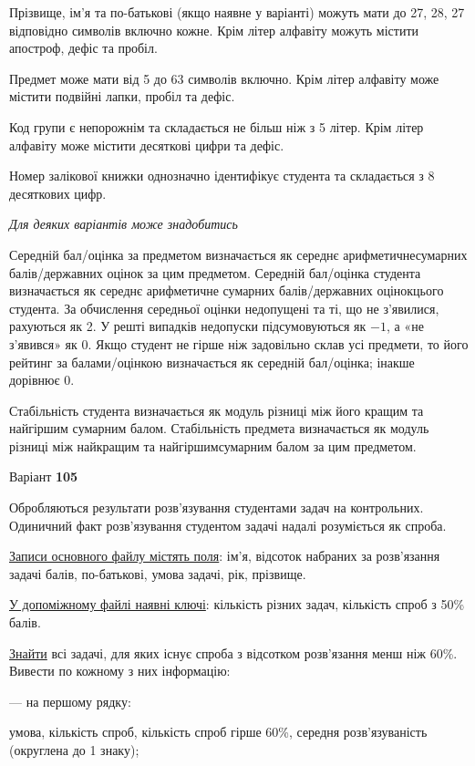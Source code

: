 \documentclass[11pt, ukrainian]{article}
\begin{document}
Прізвище, ім’я та по-батькові (якщо наявне у варіанті) можуть мати до 27, 28, 27 відповідно символів включно кожне. 
Крім літер алфавіту можуть містити апостроф, дефіс та пробіл.

Предмет може мати від 5 до 63 символів включно. 
Крім літер алфавіту може містити подвійні лапки, пробіл та дефіс.

Код групи є непорожнім та складається не більш ніж з 5 літер. 
Крім літер алфавіту може містити десяткові цифри та дефіс.


Номер залікової книжки однозначно ідентифікує студента та складається з 8 десяткових цифр. 

\bigskip\textit{Для деяких варіантів може знадобитись}

Середній бал/оцінка за предметом визначається як середнє арифметичнесумарних балів/державних оцінок за цим предметом. 
Середній бал/оцінка студента визначається як середнє арифметичне сумарних балів/державних оцінокцього студента. 
За обчислення середньої оцінки недопущені та ті, що не з’явилися, рахуються як 2.
У решті випадків недопуски підсумовуються як $-1$, а «не з’явився» як 0.
Якщо студент не гірше ніж задовільно склав усі предмети, 
то його рейтинг за балами/оцінкою визначається як середній бал/оцінка; інакше дорівнює 0.

Стабільність студента визначається як модуль різниці між його кращим та найгіршим сумарним балом.
Стабільність предмета визначається як модуль різниці між найкращим та найгіршимсумарним балом за цим предметом.






\par
\newpage
{\center Варіант  \No \textbf { 105 }\par}
\bigskip
Обробляються результати розв’язування студентами задач на контрольних.
Одиничний факт роз\-в’я\-зу\-вання студентом задачі надалі розуміється як спроба.

\underline{Записи основного файлу містять поля}: ім’я, відсоток набраних за розв’язання задачі балів, по-бать\-ко\-ві, умова задачі, рік, прізвище.

\underline{У допоміжному файлі наявні ключі}: кількість різних задач, кількість спроб з 50\% балів.

\underline{Знайти} всі задачі, для яких існує спроба з відсотком розв’язання менш ніж 60\%. Вивести по кожному з них інформацію:\par
{\noindent}--- на першому рядку:\par
умова, кількість спроб, кількість спроб гірше 60\%, середня розв’язуваність (округлена до 1 знаку);
\end{document}
